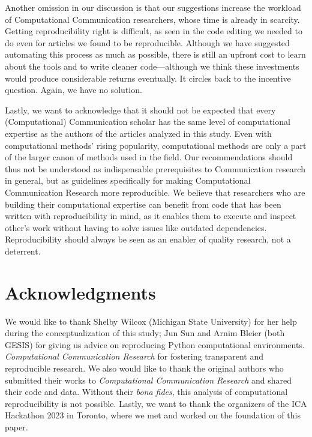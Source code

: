 Another omission in our discussion is that our suggestions increase the workload of Computational Communication researchers, whose time is already in scarcity. Getting reproducibility right is difficult, as seen in the code editing we needed to do even for articles we found to be reproducible. Although we have suggested automating this process as much as possible, there is still an upfront cost to learn about the tools and to write cleaner code---although we think these investments would produce considerable returns eventually. It circles back to the incentive question. Again, we have no solution.

Lastly, we want to acknowledge that it should not be expected that every (Computational) Communication scholar has the same level of computational expertise as the authors of the articles analyzed in this study. Even with computational methods' rising popularity, computational methods are only a part of the larger canon of methods used in the field. Our recommendations should thus not be understood as indispensable prerequisites to Communication research in general, but as guidelines specifically for making Computational Communication Research more reproducible. We believe that researchers who are building their computational expertise can benefit from code that has been written with reproducibility in mind, as it enables them to execute and inspect other's work without having to solve issues like outdated dependencies. Reproducibility should always be seen as an enabler of quality research, not a deterrent.

\section{Acknowledgments}

We would like to thank Shelby Wilcox (Michigan State University) for her help during the conceptualization of this study; Jun Sun and Arnim Bleier (both GESIS) for giving us advice on reproducing Python computational environments. 
\textit{Computational Communication Research} for fostering transparent and reproducible research. We also would like to thank the original authors who submitted their works to \textit{Computational Communication Research} and shared their code and data. Without their \textit{bona fides}, this analysis of computational reproducibility is not possible. Lastly, we want to thank the organizers of the ICA Hackathon 2023 in Toronto, where we met and worked on the foundation of this paper.
